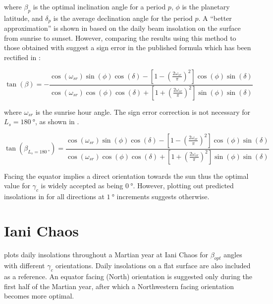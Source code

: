 where $\beta_{p}$ is the optimal inclination angle for a period $p$, $\phi$ is the planetary latitude, and $\delta_{p}$ is the average declination angle for the period $p$. A ``better approximation'' is shown in  based on the daily beam insolation on the surface from sunrise to sunset. However, comparing the results using this method to those obtained with  suggest a sign error in the published formula which has been rectified in :

\begin{equation}
  \label{eq:optimal_tanbeta_insolation}
  \tan{(\beta)} = -\frac{\cos{(\omega_{sr})}\sin{(\phi)}\cos{(\delta)}-\left[1-\left(\frac{2\omega_{sr}}{\pi}\right)^{2}\right]\cos{(\phi)}\sin{(\delta)}}{\cos{(\omega_{sr})}\cos{(\phi)}\cos{(\delta)}+\left[1+\left(\frac{2\omega_{sr}}{\pi}\right)^{2}\right]\sin{(\phi)}\sin{(\delta)}}
\end{equation}


where $\omega_{sr}$ is the sunrise hour angle. The sign error correction is not necessary for $L_{s} = \SI{180}{\degree}$, as shown in .

\begin{equation}
  \label{eq:optimal_tanbeta_insolation_Ls180}
  \tan{(\beta_{L_{s} = \SI{180}{\degree}})} = \frac{\cos{(\omega_{sr})}\sin{(\phi)}\cos{(\delta)}-\left[1-\left(\frac{2\omega_{sr}}{\pi}\right)^{2}\right]\cos{(\phi)}\sin{(\delta)}}{\cos{(\omega_{sr})}\cos{(\phi)}\cos{(\delta)}+\left[1+\left(\frac{2\omega_{sr}}{\pi}\right)^{2}\right]\sin{(\phi)}\sin{(\delta)}}
\end{equation}

Facing the equator implies a direct orientation towards the sun thus the optimal value for $\gamma_{c}$ is widely accepted as being $\SI{0}{\degree}$. However, plotting out predicted insolations in for all directions at $\SI{1}{\degree}$ increments suggests otherwise.

\section{Iani Chaos}

 plots daily insolations throughout a Martian year at Iani Chaos for $\beta_{opt}$ angles with different $\gamma_{c}$ orientations. Daily insolations on a flat surface are also included as a reference. An equator facing (North) orientation is suggested only during the first half of the Martian year, after which a Northwestern facing orientation becomes more optimal.


